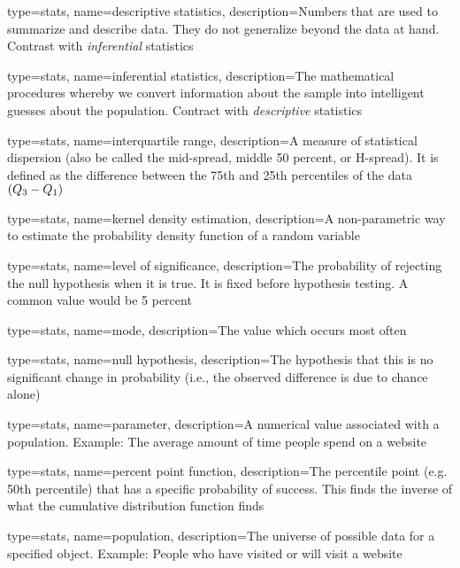 {
	type=stats,
    name=descriptive statistics,
    description={Numbers that are used to summarize and describe data.  They do not generalize beyond the data at hand.  Contrast with \textit{inferential} statistics}
}

{
	type=stats,
    name=inferential statistics,
    description={The mathematical procedures whereby we convert information about the sample into intelligent guesses about the population.  Contract with \textit{descriptive} statistics}
}

{
	type=stats,
    name=interquartile range,
    description={A measure of statistical dispersion (also be called the mid-spread, middle 50 percent, or H-spread).  It is defined as the difference between the 75th and 25th percentiles of the data $\left(\mbox{$Q_{3}$}{}-\mbox{$Q_{1}$}{}\right)$}
}

{
	type=stats,
    name=kernel density estimation,
    description={A non-parametric way to estimate the probability density function of a random variable}
}

{
	type=stats,
    name=level of significance,
    description={The probability of rejecting the null hypothesis when it is true.  It is fixed before hypothesis testing.  A common value would be 5 percent}
}

{
	type=stats,
    name=mode,
    description={The value which occurs most often}
}

{
	type=stats,
    name=null hypothesis,
    description={The hypothesis that this is no significant change in probability (i.e., the observed difference is due to chance alone)}
}

{
	type=stats,
    name=parameter,
    description={A numerical value associated with a population. Example: The average amount of time people spend on a website}
}

{
	type=stats,
    name=percent point function,
    description={The percentile point (e.g. 50th percentile) that has a specific probability of success.  This finds the inverse of what the cumulative distribution function finds}
}

{
	type=stats,
    name=population,
    description={The universe of possible data for a specified object. Example: People who have visited or will visit a website}
}

